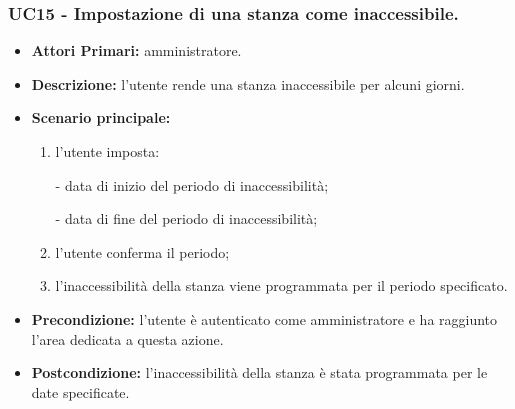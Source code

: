\subsubsection{UC15 - Impostazione di una stanza come inaccessibile.}
\begin{itemize}
	\item\textbf{Attori Primari:}
	amministratore.
	\item\textbf{Descrizione:}
	l'utente rende una stanza inaccessibile per alcuni giorni.
	\item\textbf{Scenario principale:} 
	\begin{enumerate}
		\item l'utente imposta: %
			
				- data di inizio del periodo di inaccessibilità;
				
				- data di fine del periodo di inaccessibilità;
			
		\item l'utente conferma il periodo;
		\item l'inaccessibilità della stanza viene programmata per il periodo specificato.
	\end{enumerate}
	\item\textbf{Precondizione:} 
	l'utente è autenticato come amministratore e ha raggiunto l'area dedicata a questa azione.
	\item\textbf{Postcondizione:}
	l'inaccessibilità della stanza è stata programmata per le date specificate.
\end{itemize}

